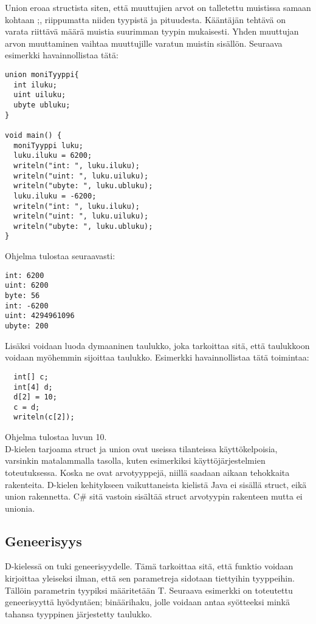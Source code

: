 \documentclass[11pt,oneside,a4paper]{article}
\begin{document}
Union eroaa structista siten, että muuttujien arvot on talletettu muistissa samaan kohtaan \cite{ALE10};\cite{KRR88}, riippumatta niiden tyypistä ja pituudesta. Kääntäjän tehtävä on varata riittävä määrä muistia suurimman tyypin mukaisesti. Yhden muuttujan arvon muuttaminen vaihtaa muuttujille varatun muistin sisällön. Seuraava esimerkki havainnollistaa tätä:
\begin{verbatim}
union moniTyyppi{
  int iluku;
  uint uiluku;
  ubyte ubluku;
}

void main() {
  moniTyyppi luku;
  luku.iluku = 6200;
  writeln("int: ", luku.iluku);
  writeln("uint: ", luku.uiluku);
  writeln("ubyte: ", luku.ubluku);
  luku.iluku = -6200;
  writeln("int: ", luku.iluku);
  writeln("uint: ", luku.uiluku);
  writeln("ubyte: ", luku.ubluku);
}
\end{verbatim}
Ohjelma tulostaa seuraavasti:

\begin{verbatim}
int: 6200
uint: 6200
byte: 56
int: -6200
uint: 4294961096
ubyte: 200
\end{verbatim}

Lisäksi voidaan luoda dymaaninen taulukko, joka tarkoittaa sitä, että taulukkoon voidaan myöhemmin sijoittaa taulukko. Esimerkki havainnollistaa tätä toimintaa:

\begin{verbatim}
  int[] c;
  int[4] d;
  d[2] = 10;
  c = d;
  writeln(c[2]);
\end{verbatim}
Ohjelma tulostaa luvun 10. \\

D-kielen tarjoama struct ja union ovat useissa tilanteissa käyttökelpoisia, varsinkin matalammalla tasolla, kuten esimerkiksi käyttöjärjestelmien toteutuksessa. Koska ne ovat arvotyyppejä, niillä saadaan aikaan tehokkaita rakenteita. D-kielen kehitykseen vaikuttaneista kielistä Java ei sisällä struct, eikä union rakennetta. C\# sitä vastoin sisältää struct arvotyypin rakenteen mutta ei unionia.

\subsection{Geneerisyys}
D-kielessä on tuki geneerisyydelle. Tämä tarkoittaa sitä, että funktio voidaan kirjoittaa yleiseksi ilman, että sen parametreja sidotaan tiettyihin tyyppeihin. Tällöin parametrin tyypiksi määritetään T. Seuraava esimerkki on toteutettu geneerisyyttä hyödyntäen; binäärihaku, jolle voidaan antaa syötteeksi minkä tahansa tyyppinen järjestetty taulukko.
\end{document}
